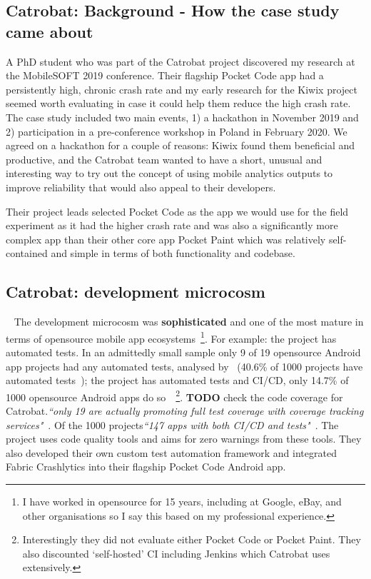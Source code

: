 
\subsection{Catrobat: Background - How the case study came about}
A PhD student who was part of the Catrobat project discovered my research at the MobileSOFT 2019 conference. Their flagship Pocket Code app had a persistently high, chronic crash rate and my early research for the Kiwix project seemed worth evaluating in case it could help them reduce the high crash rate. The case study included two main events, 1) a hackathon in November 2019 and 2) participation in a pre-conference workshop in Poland in February 2020. We agreed on a hackathon for a couple of reasons: Kiwix found them beneficial and productive, and the Catrobat team wanted to have a short, unusual and interesting way to try out the concept of using mobile analytics outputs to improve reliability that would also appeal to their developers. 

Their project leads selected Pocket Code as the app we would use for the field experiment as it had the higher crash rate and was also a significantly more complex app than their other core app Pocket Paint which was relatively self-contained and simple in terms of both functionality and codebase.



\subsection{Catrobat: development microcosm}~\label{catrobat-development-microcosm}
The development microcosm was \textbf{sophisticated} and one of the most mature in terms of opensource mobile app ecosystems~\footnote{I have worked in opensource for 15 years, including at Google, eBay, and other organisations so I say this based on my professional experience.}. For example: the project has automated tests. In an admittedly small sample only 9 of 19 opensource Android app projects had any automated tests, analysed by~\citet{silva2016_an_analysis_of_automated_tests_for_mobile_android_apps} (40.6\% of 1000 projects have automated tests~\citep[p. ]{cruz2019_guess_what_test_your_app}); the project has automated tests and CI/CD, only 14.7\% of 1000 opensource Android apps do so~\citep[p. ]{cruz2019_guess_what_test_your_app}~\footnote{Interestingly they did not evaluate either Pocket Code or Pocket Paint. They also discounted `self-hosted' CI including Jenkins which Catrobat uses extensively.}.  \textbf{TODO} check the code coverage for Catrobat.\emph{``only 19 are actually promoting full test coverage with coverage tracking services"}~\citep[p. ]{cruz2019_guess_what_test_your_app}. Of the 1000 projects\emph{``147 apps with both CI/CD and tests"}~\citep[p. ]{cruz2019_guess_what_test_your_app}. The project uses code quality tools and aims for zero warnings from these tools. They also developed their own custom test automation framework and integrated Fabric Crashlytics into their flagship Pocket Code Android app.

